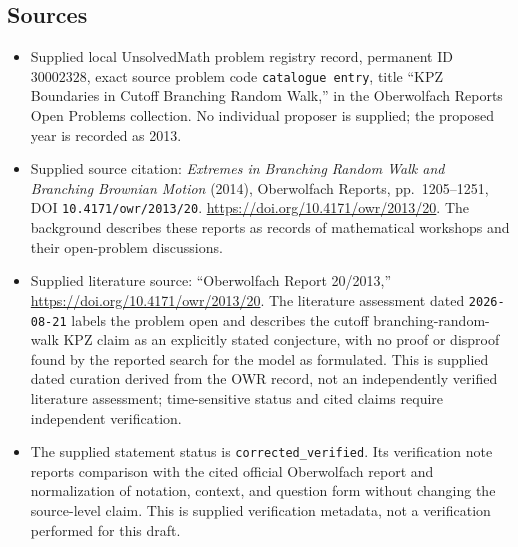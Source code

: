 \documentclass[11pt]{article}
\begin{document}
\subsection{Sources}
\begin{itemize}
\item Supplied local UnsolvedMath problem registry record, permanent ID \(30002328\), exact source problem code \texttt{catalogue entry}, title ``KPZ Boundaries in Cutoff Branching Random Walk,'' in the Oberwolfach Reports Open Problems collection. No individual proposer is supplied; the proposed year is recorded as 2013.
\item Supplied source citation: \emph{Extremes in Branching Random Walk and Branching Brownian Motion} (2014), Oberwolfach Reports, pp.~1205--1251, DOI \texttt{10.4171/owr/2013/20}. \url{https://doi.org/10.4171/owr/2013/20}. The background describes these reports as records of mathematical workshops and their open-problem discussions.
\item Supplied literature source: ``Oberwolfach Report 20/2013,'' \url{https://doi.org/10.4171/owr/2013/20}. The literature assessment dated \texttt{2026-08-21} labels the problem open and describes the cutoff branching-random-walk KPZ claim as an explicitly stated conjecture, with no proof or disproof found by the reported search for the model as formulated. This is supplied dated curation derived from the OWR record, not an independently verified literature assessment; time-sensitive status and cited claims require independent verification.
\item The supplied statement status is \texttt{corrected\_verified}. Its verification note reports comparison with the cited official Oberwolfach report and normalization of notation, context, and question form without changing the source-level claim. This is supplied verification metadata, not a verification performed for this draft.
\end{itemize}
\end{document}
